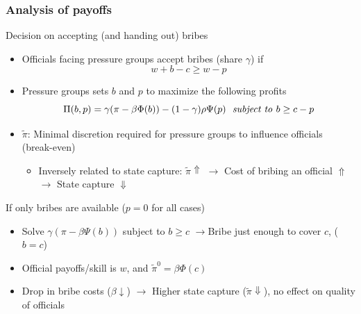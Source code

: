 \documentclass[aspectratio=169]{beamer}
\begin{document}
\begin{frame}
\frametitle{Analysis of payoffs} 
Decision on accepting (and handing out) bribes
\begin{itemize}\setlength\itemsep{3pt}
\item Officials facing pressure groups accept bribes (share $\gamma$) if \vspace{-5pt}
\[
w+b-c \geq w-p
\]
\vspace{-20pt}
\item Pressure groups sets $b$ and $p$ to maximize the following profits\vspace{-5pt}
\[
\Pi(b,p)=\gamma(\pi-\beta\Phi(b))-(1-\gamma)\rho\Psi(p) \ \ \text{\textit{subject to }}b\geq c-p
\]
\vspace{-20pt}
\item $\tilde{\pi}$: Minimal discretion required for pressure groups to influence officials (break-even)
\begin{itemize}
\item Inversely related to state capture: $\tilde{\pi}\Uparrow$ $\to$ Cost of bribing an official $\Uparrow$ $\to$ State capture  $\Downarrow$
\end{itemize}
\end{itemize}\medskip
If only bribes are available ($p=0$ for all cases)
\begin{itemize}\setlength\itemsep{3pt}
\item Solve $\gamma(\pi-\beta\Psi(b))$ subject to $b\geq c$ $\to$Bribe just enough to cover $c$, ($b=c$)
\item Official payoffs/skill is $w$, and $\tilde{\pi}^0=\beta\Phi(c)$
\item Drop in bribe costs ($\beta\downarrow$) $\to$ Higher state capture ($\tilde{\pi}\Downarrow$), no effect on quality of officials
\end{itemize}
\end{frame}
\end{document}
